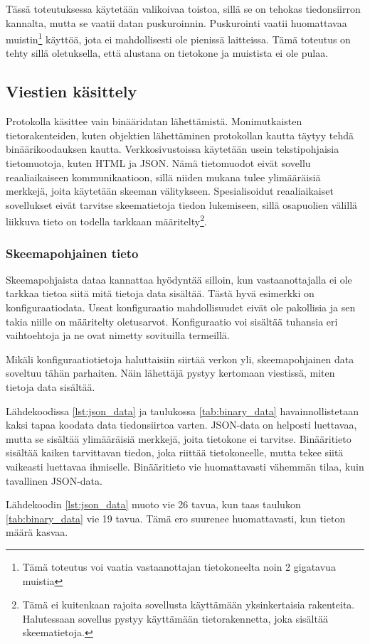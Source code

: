 \documentclass[a4paper,12pt]{article}
\begin{document}
    Tässä toteutuksessa käytetään valikoivaa toistoa, sillä se on tehokas tiedonsiirron kannalta, mutta se vaatii datan puskuroinnin. Puskurointi vaatii huomattavaa muistin\footnote{Tämä toteutus voi vaatia vastaanottajan tietokoneelta noin 2 gigatavua muistia} käyttöä, jota ei mahdollisesti ole pienissä laitteissa. Tämä toteutus on tehty sillä oletuksella, että alustana on tietokone ja muistista ei ole pulaa.\par

    \subsection{Viestien käsittely}
    Protokolla käsittee vain binääridatan lähettämistä. Monimutkaisten tietorakenteiden, kuten objektien lähettäminen protokollan kautta täytyy tehdä binäärikoodauksen kautta. Verkkosivustoissa käytetään usein tekstipohjaisia tietomuotoja, kuten HTML ja JSON. Nämä tietomuodot eivät sovellu reaaliaikaiseen kommunikaatioon, sillä niiden mukana tulee ylimääräisiä merkkejä, joita käytetään skeeman välitykseen. Spesialisoidut reaaliaikaiset sovellukset eivät tarvitse skeematietoja tiedon lukemiseen, sillä osapuolien välillä liikkuva tieto on todella tarkkaan määritelty\footnote{Tämä ei kuitenkaan rajoita sovellusta käyttämään yksinkertaisia rakenteita. Halutessaan sovellus pystyy käyttämään tietorakennetta, joka sisältää skeematietoja.}. \par

    \subsubsection{Skeemapohjainen tieto}
    Skeemapohjaista dataa kannattaa hyödyntää silloin, kun vastaanottajalla ei ole tarkkaa tietoa siitä mitä tietoja data sisältää. Tästä hyvä esimerkki on konfiguraatiodata.
    Useat konfiguraatio mahdollisuudet eivät ole pakollisia ja sen takia niille on määritelty oletusarvot. Konfiguraatio voi sisältää tuhansia eri vaihtoehtoja ja ne ovat nimetty sovituilla termeillä. \par
    Mikäli konfiguraatiotietoja haluttaisiin siirtää verkon yli, skeemapohjainen data soveltuu tähän parhaiten. Näin lähettäjä pystyy kertomaan viestissä, miten tietoja data sisältää.


    Lähdekoodissa \ref{lst:json_data} ja taulukossa \ref{tab:binary_data} havainnollistetaan kaksi tapaa koodata data tiedonsiirtoa varten. JSON-data on helposti luettavaa, mutta se sisältää ylimääräisiä merkkejä, joita tietokone ei tarvitse. Binääritieto sisältää kaiken tarvittavan tiedon, joka riittää tietokoneelle, mutta tekee siitä vaikeasti luettavaa ihmiselle. Binääritieto vie huomattavasti vähemmän tilaa, kuin tavallinen JSON-data.\par
    Lähdekoodin \ref{lst:json_data} muoto vie 26 tavua, kun taas taulukon \ref{tab:binary_data} vie 19 tavua. Tämä ero suurenee huomattavasti, kun tieton määrä kasvaa. \par
\end{document}
